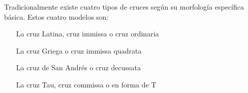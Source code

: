 Tradicionalmente existe cuatro tipos de cruces según su morfología específica básica. Estos cuatro modelos son:
\begin{itemize}
\item[La cruz Latina, cruz immissa o cruz ordinaria]
\item[La cruz Griega o cruz immissa quadrata]
\item[La cruz de San Andrés o cruz decussata]
\item[La cruz Tau, cruz commissa o en forma de T]
\end{itemize}